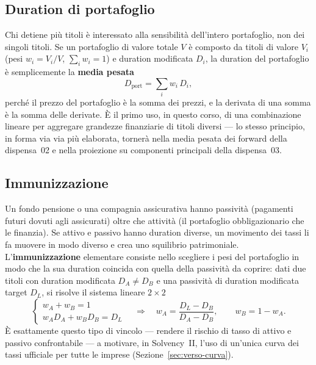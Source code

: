 \documentclass[11pt,a4paper]{article}
\theoremstyle{plain}
\theoremstyle{definition}
\theoremstyle{remark}
\begin{document}
\subsection{Duration di portafoglio}

Chi detiene più titoli è interessato alla sensibilità dell'intero portafoglio, non dei singoli
titoli. Se un portafoglio di valore totale $V$ è composto da titoli di valore $V_i$ (pesi
$w_i=V_i/V$, $\sum_i w_i=1$) e duration modificata $D_i$, la duration del portafoglio è
semplicemente la \textbf{media pesata}
\begin{equation}
  D_{\mathrm{port}} = \sum_i w_i\, D_i,
  \label{eq:duration-portafoglio}
\end{equation}
perché il prezzo del portafoglio è la somma dei prezzi, e la derivata di una somma è la somma
delle derivate. \`E il primo uso, in questo corso, di una combinazione lineare per aggregare
grandezze finanziarie di titoli diversi --- lo stesso principio, in forma via via più elaborata,
tornerà nella media pesata dei forward della dispensa~02 e nella proiezione su
componenti principali della dispensa~03.

\subsection{Immunizzazione}

Un fondo pensione o una compagnia assicurativa hanno passività (pagamenti futuri dovuti agli
assicurati) oltre che attività (il portafoglio obbligazionario che le finanzia). Se attivo e
passivo hanno duration diverse, un movimento dei tassi li fa muovere in modo diverso e crea uno
squilibrio patrimoniale. L'\textbf{immunizzazione} elementare consiste nello scegliere i pesi
del portafoglio in modo che la sua duration coincida con quella della passività da coprire:
dati due titoli con duration modificata $D_A\neq D_B$ e una passività di duration modificata
target $D_L$, si risolve il sistema lineare $2\times 2$
\begin{equation}
  \begin{cases} w_A + w_B = 1\\[2pt] w_A D_A + w_B D_B = D_L \end{cases}
  \quad\Longrightarrow\quad
  w_A = \dfrac{D_L - D_B}{D_A - D_B}, \qquad w_B = 1-w_A.
  \label{eq:immunizzazione}
\end{equation}
\`E esattamente questo tipo di vincolo --- rendere il rischio di tasso di attivo e passivo
confrontabile --- a motivare, in Solvency~II, l'uso di un'unica curva dei tassi ufficiale
per tutte le imprese (Sezione~\ref{sec:verso-curva}).
\end{document}
